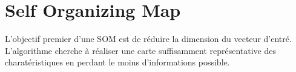 \chapter{Self Organizing Map}

L'objectif premier d'une SOM est de réduire la dimension du vecteur d'entré. L'algorithme cherche à réaliser une carte suffisamment représentative des charatéristiques en perdant le moins d'informations possible.
